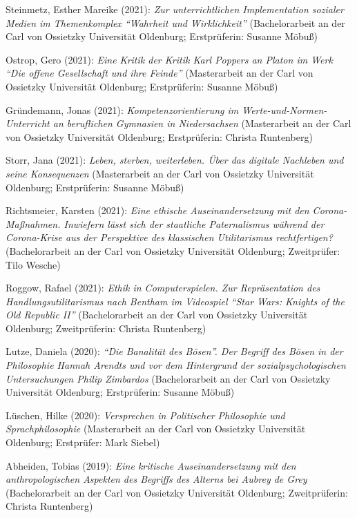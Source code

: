 \documentclass[a4paper,10pt]{article}
\newenvironment{literature}{%
   \parskip6pt\parindent0pt\raggedright
   \def\lititem{\hangindent=1cm\hangafter1}}{%
   \par\ignorespaces}
\begin{document}
\begin{literature}
\lititem Steinmetz, Esther Mareike (2021): \textit{Zur unterrichtlichen Implementation sozialer Medien im Themenkomplex \enquote{Wahrheit und Wirklichkeit}} (Bachelorarbeit an der Carl von Ossietzky Universität Oldenburg; Erstprüferin: Susanne Möbuß)

\lititem Ostrop, Gero (2021): \textit{Eine Kritik der Kritik Karl Poppers an Platon im Werk \enquote{Die offene Gesellschaft und ihre Feinde}} (Masterarbeit an der Carl von Ossietzky Universität Oldenburg; Erstprüferin: Susanne Möbuß)

\lititem Gründemann, Jonas (2021): \textit{Kompetenzorientierung im Werte-und-Normen-Unterricht an beruflichen Gymnasien in Niedersachsen} (Masterarbeit an der Carl von Ossietzky Universität Oldenburg; Erstprüferin: Christa Runtenberg)

\lititem Storr, Jana (2021): \textit{Leben, sterben, weiterleben. Über das digitale Nachleben und seine Konsequenzen} (Masterarbeit an der Carl von Ossietzky Universität Oldenburg; Erstprüferin: Susanne Möbuß)

\lititem Richtsmeier, Karsten (2021): \textit{Eine ethische Auseinandersetzung mit den Corona-Maßnahmen. Inwiefern lässt sich der staatliche Paternalismus während der Corona-Krise aus der Perspektive des klassischen Utilitarismus rechtfertigen?} (Bachelorarbeit an der Carl von Ossietzky Universität Oldenburg; Zweitprüfer: Tilo Wesche)

\lititem Roggow, Rafael (2021): \textit{Ethik in Computerspielen. Zur Repräsentation des Handlungsutilitarismus nach Bentham im Videospiel \enquote{Star Wars: Knights of the Old Republic II}} (Bachelorarbeit an der Carl von Ossietzky Universität Oldenburg; Zweitprüferin: Christa Runtenberg)

\lititem Lutze, Daniela (2020): \textit{\enquote{Die Banalität des Bösen}. Der Begriff des Bösen in der Philosophie Hannah Arendts und vor dem Hintergrund der sozialpsychologischen Untersuchungen Philip Zimbardos} (Bachelorarbeit an der Carl von Ossietzky Universität Oldenburg; Erstprüferin: Susanne Möbuß)

\lititem Lüschen, Hilke (2020): \textit{Versprechen in Politischer Philosophie und Sprachphilosophie} (Masterarbeit an der Carl von Ossietzky Universität Oldenburg; Erstprüfer: Mark Siebel)

\lititem Abheiden, Tobias (2019): \textit{Eine kritische Auseinandersetzung mit den anthropologischen Aspekten des Begriffs des Alterns bei Aubrey de Grey} (Bachelorarbeit an der Carl von Ossietzky Universität Oldenburg; Zweitprüferin: Christa Runtenberg)
\end{literature}
\end{document}
